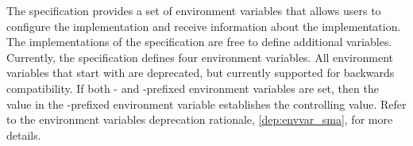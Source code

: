 
The \openshmem specification provides a set of environment variables that allows
users to configure the \openshmem implementation and receive information about
the implementation. The implementations of the specification are free to define
additional variables. Currently, the specification defines four environment
variables. All environment variables that start with  are
deprecated, but currently supported for backwards compatibility.
If both - and -prefixed environment variables
are set, then the value in the -prefixed environment variable
establishes the controlling value.
Refer to the  environment variables deprecation rationale,
\cref{dep:envvar_sma}, for more details.

\medskip{}

